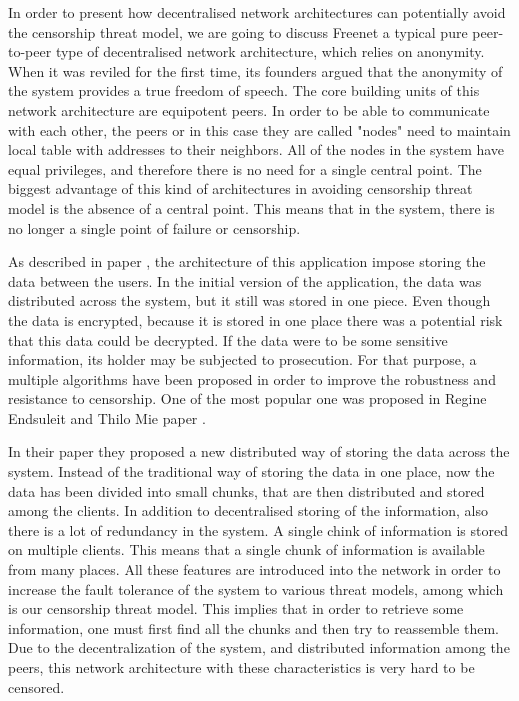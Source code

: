 In order to present how decentralised network architectures can potentially avoid the censorship threat model, we are going to discuss Freenet \cite{clarke2001} a typical pure peer-to-peer \cite{web:peertopeer} type of decentralised network architecture, which relies on anonymity. When it was reviled for the first time, its founders argued that the anonymity of the system provides a true freedom of speech. The core building units of this network architecture are equipotent peers. In order to be able to communicate with each other, the peers or in this case they are called "nodes" need to maintain local table with addresses to their neighbors. All of the nodes in the system have equal privileges, and therefore there is no need for a single central point. The biggest advantage of this kind of architectures in avoiding censorship threat model is the absence of a central point. This means that in the system, there is no longer a single point of failure or censorship.  

As described in paper \cite{clarke2001}, the architecture of this application impose storing the data between the users. In the initial version of the application, the data was distributed across the system, but it still was stored in one piece. Even though the data is encrypted, because it is stored in one place there was a potential risk that this data could be decrypted. If the data were to be some sensitive information, its holder may be subjected to prosecution. For that purpose, a multiple algorithms have been proposed in order to improve the robustness and resistance to censorship. One of the most popular one was proposed in Regine Endsuleit and Thilo Mie paper \cite{endsuleit2006}. 

In their paper they proposed a new distributed way of storing the data across the system. Instead of the traditional way of storing the data in one place, now the data has been divided into small chunks, that are then distributed and stored among the clients. In addition to decentralised storing of the information, also there is a lot of redundancy in the system. A single chink of information is stored on multiple clients. This means that a single chunk of information is available from many places. All these features are introduced into the network in order to increase the fault tolerance of the system to various threat models, among which is our censorship threat model. This implies that in order to retrieve some information, one must first find all the chunks and then try to reassemble them. Due to the decentralization of the system, and distributed information among the peers, this network architecture with these characteristics is very hard to be censored.
